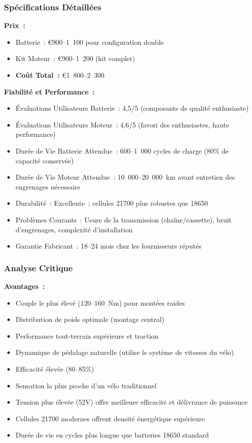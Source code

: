 \documentclass[12pt,a4paper]{article}
\begin{document}
\subsubsection{Spécifications Détaillées}

\textbf{Prix~:}
\begin{itemize}
    \item Batterie~: €900--1~100 pour configuration double \cite{aliexpress-batteries}
    \item Kit Moteur~: €900--1~200 (kit complet) \cite{aliexpress-batteries}
    \item \textbf{Coût Total~:} €1~800--2~300
\end{itemize}

\textbf{Fiabilité et Performance~:}
\begin{itemize}
    \item Évaluations Utilisateurs Batterie~: 4,5/5 (composants de qualité enthusiaste) \cite{aliexpress-batteries, amazon-components}
    \item Évaluations Utilisateurs Moteur~: 4,6/5 (favori des enthusiastes, haute performance) \cite{endless-sphere, ebike-review}
    \item Durée de Vie Batterie Attendue~: 600--1~000 cycles de charge (80\% de capacité conservée)
    \item Durée de Vie Moteur Attendue~: 10~000--20~000~km avant entretien des engrenages nécessaire
    \item Durabilité~: Excellente~; cellules 21700 plus robustes que 18650
    \item Problèmes Courants~: Usure de la transmission (chaîne/cassette), bruit d'engrenages, complexité d'installation
    \item Garantie Fabricant~: 18--24 mois chez les fournisseurs réputés
\end{itemize}

\subsubsection{Analyse Critique}

\textbf{Avantages~:}
\begin{itemize}
    \item Couple le plus élevé (120--160~Nm) pour montées raides
    \item Distribution de poids optimale (montage central)
    \item Performance tout-terrain supérieure et traction
    \item Dynamique de pédalage naturelle (utilise le système de vitesses du vélo)
    \item Efficacité élevée (80--85\%)
    \item Sensation la plus proche d'un vélo traditionnel
    \item Tension plus élevée (52V) offre meilleure efficacité et délivrance de puissance
    \item Cellules 21700 modernes offrent densité énergétique supérieure
    \item Durée de vie en cycles plus longue que batteries 18650 standard
\end{itemize}
\end{document}
